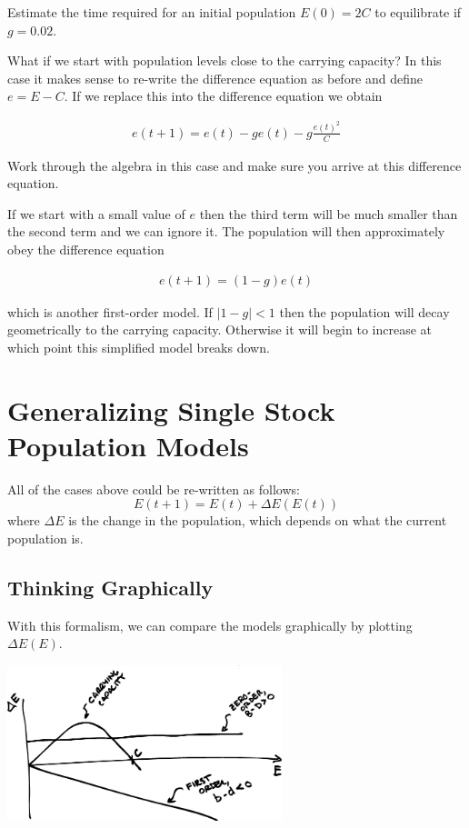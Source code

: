 \begin{del}
Estimate the time required for an initial population $E(0) = 2C$ to equilibrate if $g = 0.02$.
\end{del}  

What if we start with population levels close to the carrying capacity? In this case it makes sense to re-write the difference equation as before and define $e = E-C$. If we replace this into the difference equation we obtain

\begin{eqnarray*}
e(t+1) = e(t) - ge(t) - g \frac{e(t)^2}{C}
\end{eqnarray*}

\begin{del}
Work through the algebra in this case and make sure you arrive at this difference equation.
\end{del}

If we start with a small value of $e$ then the third term will be much smaller than the second term and we can ignore it. The population will then approximately obey the difference equation

\begin{eqnarray*}
e(t+1) = (1-g) e(t)
\end{eqnarray*}

which is another first-order model. If $|1-g| < 1$ then the population will decay geometrically to the carrying capacity. Otherwise it will begin to increase at which point this simplified model breaks down.

\section*{Generalizing Single Stock Population Models}

All of the cases above could be re-written as follows:
$$ E(t+1) = E(t) + \Delta E(E(t))$$
where $\Delta E$ is the change in the population, which depends on what the current population is.


\subsection{Thinking Graphically}
With this formalism, we can compare the models graphically by plotting $\Delta E(E)$.  

\centerline{\includegraphics[width=8cm]{figs/DeltaEvsE.png}}

